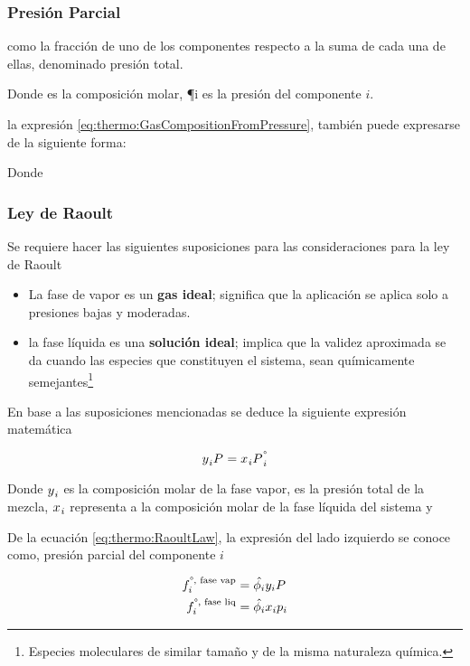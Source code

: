 \subsubsection{Presión Parcial}
como la fracción de uno de los componentes respecto a la suma de cada una de ellas, denominado presión total.

\eqGasCompositionFromPressure
Donde  es la composición molar, {\P{i}} es la presión del componente {${i}$}.

la expresión \eqref{eq:thermo:GasCompositionFromPressure}, también puede expresarse de la siguiente forma:

\eqGasCompositionFromTotalPressure
Donde

\subsubsection*{Ley de Raoult}
Se requiere hacer las siguientes suposiciones para las consideraciones para la ley de Raoult \parencite{Smith.VanNess.Abbott2007}
\begin{itemize}
  \item La fase de vapor es un \textbf{gas ideal}; significa que la aplicación se aplica solo a presiones bajas y moderadas.
  \item la fase líquida es una \textbf{solución ideal}; implica que la validez aproximada se da cuando las especies que constituyen el sistema, sean químicamente semejantes\footnote{Especies moleculares de similar tamaño y de la misma naturaleza química.}
\end{itemize}

En base a las suposiciones mencionadas se deduce la siguiente expresión matemática

\begin{equation}
  \eqRaoultLaw
\end{equation}

Donde {${y_{}}_{i}$} es la composición molar de la fase vapor,  {\pressure} es la presión total de la mezcla, {${x_{}}_{i}$} representa a la composición molar de la fase líquida del sistema y

De la ecuación \eqref{eq:thermo:RaoultLaw}, la expresión del lado izquierdo se conoce como, presión parcial del componente ${i}$


\begin{align}
  f_{i}^{\degree, \text{ fase vap}} & = \hat{\phi_{i}} {y_{i}} P_{}^{} \\
  f_{i}^{\degree, \text{ fase liq}} & = \hat{\phi_{i}} {x_{i}} p_{i}
\end{align}

